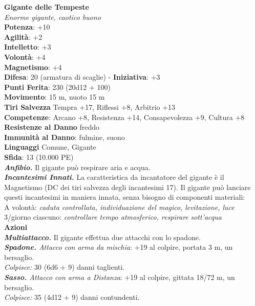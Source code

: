 \begin{multicols}{2}
\medskip\textbf{Gigante delle Tempeste}\\
\emph{Enorme gigante, caotico buono}\\
\textbf{Potenza}: +10\\
\textbf{Agilità}: +2\\
\textbf{Intelletto}: +3\\
\textbf{Volontà}: +4\\
\textbf{Magnetismo}: +4\\
\textbf{Difesa}: 20 (armatura di scaglie) - \textbf{Iniziativa}: +3\\
\textbf{Punti Ferita}: 230 (20d12 + 100)\\
\textbf{Movimento}: 15 m, nuoto 15 m\\
\textbf{Tiri Salvezza} Tempra +17, Riflessi +8, Arbitrio +13\\
\textbf{Competenze}: Arcano +8, Resistenza +14, Consapevolezza +9, Cultura +8\\
\textbf{Resistenze al Danno} freddo\\
\textbf{Immunità al Danno}: fulmine, suono\\
\textbf{Linguaggi} Comune, Gigante\\
\textbf{Sfida}: 13 (10.000 PE)\smallskip\\
\emph{\textbf{Anfibio.}} Il gigante può respirare aria e acqua.\\
\emph{\textbf{Incantesimi Innati.}} La caratteristica da incantatore del gigante è il Magnetismo (DC dei tiri salvezza degli incantesimi 17). Il gigante può lanciare questi incantesimi in maniera innata, senza bisogno di componenti materiali:\\
A volontà: \emph{caduta controllata, individuazione del magico,} \emph{levitazione, luce}\\
3/giorno ciascuno: \emph{controllare tempo atmosferico, respirare} \emph{sott'acqua}\\
\smallskip\textbf{Azioni}\\
\emph{\textbf{Multiattacco.}} Il gigante effettua due attacchi con lo spadone.\\
\emph{\textbf{Spadone.} Attacco con arma da mischia}: +19 al colpire, portata 3 m, un bersaglio.\\
\emph{Colpisce:} 30 (6d6 + 9) danni taglienti.\\
\emph{\textbf{Sasso.} Attacco con arma a Distanza}: +19 al colpire, gittata 18/72 m, un bersaglio.\\
\emph{Colpisce:} 35 (4d12 + 9) danni contundenti.\\

\end{multicols}
